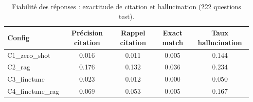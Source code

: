 \begin{table}[t]
\centering
\caption{Fiabilité des réponses : exactitude de citation et hallucination (222 questions test).}
\label{tab:citation-hallucination}
\begin{tabular}{lcccc}
\toprule
Config & Précision citation & Rappel citation & Exact match & Taux hallucination \\
\midrule
C1_zero_shot & 0.016 & 0.011 & 0.005 & 0.144 \\
C2_rag & 0.176 & 0.132 & 0.036 & 0.234 \\
C3_finetune & 0.023 & 0.012 & 0.000 & 0.050 \\
C4_finetune_rag & 0.069 & 0.053 & 0.005 & 0.167 \\
\bottomrule
\end{tabular}
\end{table}

